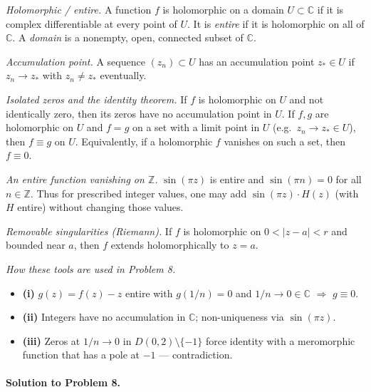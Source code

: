 \documentclass[11pt,a4paper]{article}
\theoremstyle{definition}
\theoremstyle{definition}
\theoremstyle{plain}
\theoremstyle{remark}
\begin{document}
\emph{Holomorphic / entire.}
A function $f$ is holomorphic on a domain $U\subset\mathbb C$ if it is complex differentiable at every point of $U$.
It is \emph{entire} if it is holomorphic on all of $\mathbb C$.
A \emph{domain} is a nonempty, open, connected subset of $\mathbb C$.

\medskip
\emph{Accumulation point.}
A sequence $(z_n)\subset U$ has an accumulation point $z_\ast\in U$ if $z_n\to z_\ast$ with $z_n\neq z_\ast$ eventually.

\medskip
\emph{Isolated zeros and the identity theorem.}
If $f$ is holomorphic on $U$ and not identically zero, then its zeros have no accumulation point in $U$.
If $f,g$ are holomorphic on $U$ and $f=g$ on a set with a limit point in $U$ (e.g.\ $z_n\to z_\ast\in U$), then $f\equiv g$ on $U$.
Equivalently, if a holomorphic $f$ vanishes on such a set, then $f\equiv 0$.

\medskip
\emph{An entire function vanishing on $\mathbb Z$.}
$\sin(\pi z)$ is entire and $\sin(\pi n)=0$ for all $n\in\mathbb Z$.
Thus for prescribed integer values, one may add $\sin(\pi z)\cdot H(z)$ (with $H$ entire) without changing those values.

\medskip
\emph{Removable singularities (Riemann).}
If $f$ is holomorphic on $0<|z-a|<r$ and bounded near $a$, then $f$ extends holomorphically to $z=a$.

\medskip
\emph{How these tools are used in Problem 8.}
\begin{itemize}
	\item \textbf{(i)} $g(z)=f(z)-z$ entire with $g(1/n)=0$ and $1/n\to 0\in\mathbb C$ $\Rightarrow$ $g\equiv 0$.
	\item \textbf{(ii)} Integers have no accumulation in $\mathbb C$; non-uniqueness via $\sin(\pi z)$.
	\item \textbf{(iii)} Zeros at $1/n\to 0$ in $D(0,2)\setminus\{-1\}$ force identity with a meromorphic function that has a pole at $-1$ — contradiction.
\end{itemize}

\medskip
\paragraph{Solution to Problem 8.}
\end{document}
